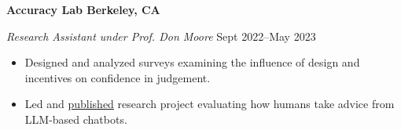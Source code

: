 \textbf{Accuracy Lab \hfill Berkeley, CA}\par

\textit{Research Assistant under Prof. Don Moore} \hfill Sept 2022--May 2023\par
\begin{itemize}
	\item Designed and analyzed surveys examining the influence of design and incentives on confidence in judgement.
	\item Led and \href{https://arxiv.org/abs/2305.11888}{published} research project evaluating how humans take advice from LLM-based chatbots.
\end{itemize}\par